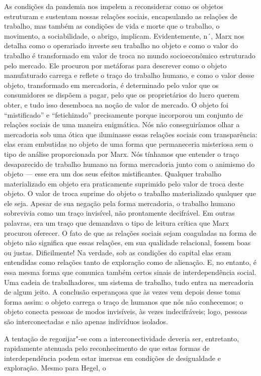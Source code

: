 \begin{multicols}{2}
As condições da pandemia nos impelem a reconsiderar como os objetos
estruturam e sustentam nossas relações sociais, encapsulando as relações
de trabalho, mas também as condições de vida e morte que o trabalho, o
movimento, a sociabilidade, o abrigo, implicam. Evidentemente, n´{}, Marx nos detalha como o operariado investe seu trabalho no
objeto e como o valor do trabalho é transformado em valor de troca no
mundo socioeconômico estruturado pelo mercado. Ele procurou por
metáforas para descrever como o objeto manufaturado carrega e reflete o
traço do trabalho humano, e como o valor desse objeto, transformado em
mercadoria, é determinado pelo valor que os consumidores se dispõem a
pagar, pelo que os proprietários do lucro querem obter, e tudo isso
desemboca na noção de valor de mercado. O objeto foi ``mistificado'' e
``fetichizado'' precisamente porque incorporou um conjunto de relações
sociais de uma maneira enigmática. Nós não conseguiríamos olhar a
mercadoria sob uma ótica que iluminasse essas relações sociais com
transparência: elas eram embutidas no objeto de uma forma que
permaneceria misteriosa sem o tipo de análise proporcionada por Marx.
Nós tínhamos que entender o traço desaparecido de trabalho humano na
forma mercadoria junto com o animismo do objeto --- esse era um dos seus
efeitos mistificantes. Qualquer trabalho materializado em objeto era
praticamente suprimido pelo valor de troca deste objeto. O valor de
troca suprime do objeto o trabalho materializado qualquer que ele seja.
Apesar de sua negação pela forma mercadoria, o trabalho humano
sobrevivia como um traço invisível, não prontamente decifrável. Em
outras palavras, era um traço que demandava o tipo de leitura crítica
que Marx procurou oferecer. O fato de que as relações sociais sejam
coaguladas na forma de objeto não significa que essas relações, em sua
qualidade relacional, fossem boas ou justas. Dificilmente! Na verdade,
sob as condições do capital elas eram entendidas como relações tanto de
exploração como de alienação. E, no entanto, é essa mesma forma que
comunica também certos sinais de interdependência social. Uma cadeia de
trabalhadores, um sistema de trabalho, tudo entra na mercadoria de algum
jeito. A conclusão esperançosa que às vezes vem depois desse
{} toma forma assim: o objeto carrega o traço de humanos que
nós não conhecemos; o objeto conecta pessoas de modos invisíveis, às
vezes indecifráveis; logo, pessoas são interconectadas e não apenas
indivíduos isolados.

A tentação de regozijar"-se com a interconectividade deveria ser,
entretanto, rapidamente atenuada pelo reconhecimento de que estas formas
de interdependência podem estar imersas em condições de desigualdade e
exploração. Mesmo para Hegel, o \linebreak


\end{multicols}
